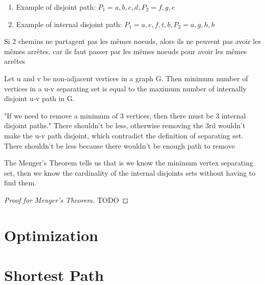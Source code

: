 \documentclass{article}
\begin{document}
\begin{proposition}
    \begin{enumerate}
	\item Example of disjoint path: $P_1={a,b,c,d}, P_2={f,g,e}$
	\item Example of internal disjoint path: $P_1={a,e,f,t,b},
	    P_2={a,g,h,b}$
    \end{enumerate}
\end{proposition}

\begin{theorem}
\end{theorem}

\begin{intuition}
    Si 2 chemins ne partagent pas les mêmes noeuds, alors ils ne peuvent
    pas avoir les mêmes arrêtes, car ils faut passer par les mêmes noeuds
    pour avoir les mêmes arrêtes
\end{intuition}

\begin{theorem}
    Let u and v be non-adjacent vertices in a graph G. Then minimum number
    of vertices in a u-v separating set is equal to the maximum number
    of internally disjoint u-v path in G.
\end{theorem}

\begin{intuition}
    "If we need to remove a minimum of 3 vertices, then there must be 3
    internal disjoint paths." There shouldn't be less, otherwise removing
    the 3rd wouldn't make the u-v path disjoint, which contradict the
    definition of separating set. There shouldn't be less because there
    wouldn't be enough path to remove
\end{intuition}

\begin{remark}
    The Menger's Theorem tells us that is we know the minimum vertex
    separating set, then we know the cardinality of the internal disjoints
    sets without having to find them.
\end{remark}

\begin{proof}[Proof for Menger's Theorem]
    TODO
\end{proof}

\section{Optimization}
\section{Shortest Path}
\end{document}
